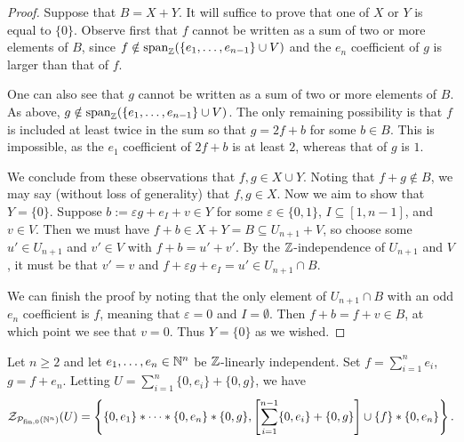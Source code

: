 \begin{proof}
Suppose that $B = X + Y$.
It will suffice to prove that one of $X$ or $Y$ is equal to $\{0\}$.
Observe first that $f$ cannot be written as a sum of two or more elements of $B$, since $f\notin \operatorname{span}_{\mathbb{Z}} (\{e_1,\dots, e_{n-1}\}\cup V)$ and the $e_n$ coefficient of $g$ is larger than that of $f$.

One can also see that $g$ cannot be written as a sum of two or more elements of $B$.
As above, $g\notin \operatorname{span}_{\mathbb{Z}} (\{e_1,\dots, e_{n-1}\}\cup V)$.
The only remaining possibility is that $f$ is included at least twice in the sum so that $g = 2f + b$ for some $b\in B$.
This is impossible, as the $e_1$ coefficient of $2f+b$ is at least $2$, whereas that of $g$ is $1$.

We conclude from these observations that $f,g\in X \cup Y$.
Noting that $f+g \notin B$, we may say (without loss of generality) that $f,g\in X$.
Now we aim to show that $Y = \{0\}$.
Suppose $b := \varepsilon g + e_I +v \in Y$ for some $\varepsilon \in \{0,1\}$, $I\subseteq [ 1,n-1]$, and $v\in V$.
Then we must have $f + b \in X+Y = B \subseteq U_{n+1} + V$, so choose some $u'\in U_{n+1}$ and $v'\in V$ with $f + b = u' + v'$.
By the $\mathbb{Z}$-independence of $U_{n+1}$ and $V$, it must be that $v' = v$ and $f + \varepsilon g + e_I = u' \in U_{n+1} \cap B$.

We can finish the proof by noting that the only element of $U_{n+1}\cap B$ with an odd $e_n$ coefficient is $f$, meaning that $\varepsilon=0$ and $I = \emptyset$.
Then $f+b = f+v \in B$, at which point we see that $v = 0$.
Thus $Y = \{0\}$ as we wished.
\end{proof}

\begin{thm} \label{thm:2n-length-set}
Let $n\ge 2$ and let $e_1,\dots, e_n\in \mathbb{N}^n$ be $\mathbb{Z}$-linearly independent.
Set $f = \sum_{i=1}^n e_i$, $g=f+e_n$.
Letting $U = \sum_{i=1}^n \{0,e_i\} + \{0,g\}$, we have 
\[\mathcal{Z}_{\mathcal{P}_{\textrm{fin}, 0}(\mathbb{N}^n)}(U) = \left\{ \{0,e_1\}*\cdots*\{0,e_n\}*\{0,g\}, \left[\sum_{i=1}^{n-1}\{0,e_i\}+\{0,g\}\right]\cup\{f\} * \{0,e_n\} \right\}. \]
\end{thm}

